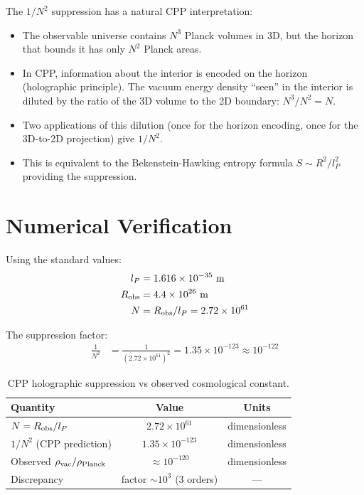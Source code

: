 \documentclass[11pt]{article}
\begin{document}
The $1/N^2$ suppression has a natural CPP interpretation:
\begin{itemize}
\item The observable universe contains $N^3$ Planck volumes in 3D,
  but the horizon that bounds it has only $N^2$ Planck areas.
\item In CPP, information about the interior is encoded on the
  horizon (holographic principle).  The vacuum energy density
  ``seen'' in the interior is diluted by the ratio of the
  3D volume to the 2D boundary: $N^3/N^2 = N$.
\item Two applications of this dilution (once for the horizon
  encoding, once for the 3D-to-2D projection) give $1/N^2$.
\item This is equivalent to the Bekenstein-Hawking entropy
  formula $S \sim R^2/l_P^2$ providing the suppression.
\end{itemize}

\section{Numerical Verification}

Using the standard values:
\begin{align}
l_P &= 1.616 \times 10^{-35}~\text{m} \\
R_{\rm obs} &= 4.4 \times 10^{26}~\text{m} \\
N &= R_{\rm obs}/l_P = 2.72 \times 10^{61}
\end{align}

The suppression factor:
\begin{align}
\frac{1}{N^2} &= \frac{1}{(2.72 \times 10^{61})^2}
= 1.35 \times 10^{-123}
\approx 10^{-122}
\end{align}

\begin{table}[h]
\centering
\begin{tabular}{lcc}
\toprule
Quantity & Value & Units \\
\midrule
$N = R_{\rm obs}/l_P$ & $2.72 \times 10^{61}$ & dimensionless \\
$1/N^2$ (CPP prediction) & $1.35 \times 10^{-123}$ & dimensionless \\
Observed $\rho_{\rm vac}/\rho_{\rm Planck}$ & $\approx 10^{-120}$ & dimensionless \\
Discrepancy & factor $\sim 10^3$ (3 orders) & — \\
\bottomrule
\end{tabular}
\caption{CPP holographic suppression vs observed cosmological constant.}
\end{table}
\end{document}
